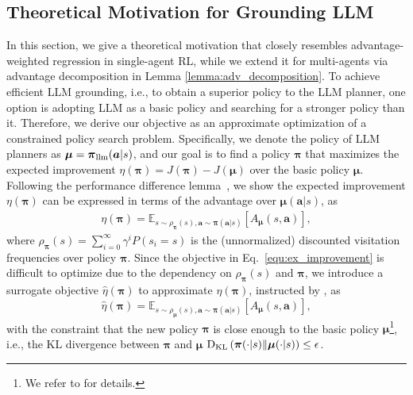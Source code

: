 \documentclass[11pt]{article}
\theoremstyle{plain}
\theoremstyle{remark}
\begin{document}
\subsection{Theoretical Motivation for Grounding LLM} \label{section:3-2}
In this section, we give a theoretical motivation that closely resembles advantage-weighted regression \citep{peng2019advantageweighted} in single-agent RL, while we extend it for multi-agents via advantage decomposition in Lemma \ref{lemma:adv_decomposition}.
To achieve efficient LLM grounding, i.e., to obtain a superior policy to the LLM planner, one option is adopting LLM as a basic policy and searching for a stronger policy than it. %
Therefore, we derive our objective as an approximate optimization of a constrained policy search problem. Specifically, we denote the policy of LLM planners as $\boldsymbol{\mu}=\boldsymbol{\pi}_{\rm llm}(\boldsymbol{a}|s)$, and our goal is to find a policy $\boldsymbol{\pi}$ that maximizes the expected improvement $\eta(\boldsymbol{\pi})=J(\boldsymbol{\pi}) - J(\boldsymbol{\mu})$ over the basic policy $\boldsymbol{\mu}$. %
Following the performance difference lemma~\citep{Langford02icml, pmlr-v37-schulman15ppo}, we show the expected improvement $\eta(\boldsymbol{\pi})$ can be expressed in terms of the advantage over $\boldsymbol{\mu}(\boldsymbol{a}|s)$, as
\begin{equation}
\label{equ:ex_improvement}
\begin{split}
\eta(\boldsymbol{\pi})=\mathbb{E}_{s \sim \rho_{\boldsymbol{\pi}}(s), \boldsymbol{a} \sim \boldsymbol{\pi}(\boldsymbol{a}|s)}\left[A_{\boldsymbol{\mu}}(s, \boldsymbol{a})\right],
\end{split}
\end{equation}
where $\rho_{\boldsymbol{\pi}}(s) = \sum_{i=0}^{\infty}\gamma^{i}P(s_i=s)$ is the (unnormalized) discounted visitation frequencies over policy $\boldsymbol{\pi}$. Since the objective in Eq.~\eqref{equ:ex_improvement} is difficult to optimize due to the dependency on $\rho_{\boldsymbol{\pi}}(s)$ and $\boldsymbol{\pi}$, we introduce a surrogate objective $\hat{\eta}(\boldsymbol{\pi})$ to approximate $\eta(\boldsymbol{\pi})$, instructed by \citet{pmlr-v37-schulman15ppo}, as 
\begin{equation}
\label{equ:approximate_improvement}
    \hat{\eta}(\boldsymbol{\pi}) = \mathbb{E}_{s \sim \rho_{\boldsymbol{\mu}}(s), \boldsymbol{a} \sim \boldsymbol{\pi}(\boldsymbol{a}|s)}\left[A_{\boldsymbol{\mu}}(s, \boldsymbol{a})\right],
\end{equation}
with the constraint that the new policy $\boldsymbol{\pi}$ is close enough to the basic policy $\boldsymbol{\mu}$\footnote{We refer to \citet{pmlr-v37-schulman15ppo} for details.}, i.e., the KL divergence between $\boldsymbol{\pi}$ and $\boldsymbol{\mu}$ ${\rm D}_{\rm KL}\left(\boldsymbol{\pi}(\cdot|s) \| \boldsymbol{\mu}(\cdot|s)\right) \leq \epsilon$.
\end{document}
